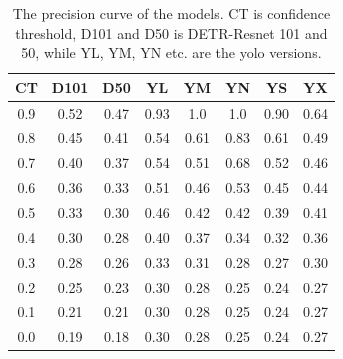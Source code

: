 \begin{table}
    \begin{centering}
    \begin{tabular}{|c||c|c|c|c|c|c|c|}
        \hline
        CT & D101 & D50 & YL & YM & YN & YS & YX \\
        \hline
        \hline
        0.9 & 0.52 & 0.47 & 0.93 & 1.0 & 1.0 & 0.90 & 0.64 \\
        \hline
        0.8 & 0.45 & 0.41 & 0.54 & 0.61 & 0.83 & 0.61 & 0.49 \\
        \hline
        0.7 & 0.40 & 0.37 & 0.54 & 0.51 & 0.68 & 0.52 & 0.46 \\
        \hline
        0.6 & 0.36 & 0.33 & 0.51 & 0.46 & 0.53 & 0.45 & 0.44 \\
        \hline
        0.5 & 0.33 & 0.30 & 0.46 & 0.42 & 0.42 & 0.39 & 0.41 \\
        \hline
        0.4 & 0.30 & 0.28 & 0.40 & 0.37 & 0.34 & 0.32 & 0.36 \\
        \hline
        0.3 & 0.28 & 0.26 & 0.33 & 0.31 & 0.28 & 0.27 & 0.30 \\
        \hline
        0.2 & 0.25 & 0.23 & 0.30 & 0.28 & 0.25 & 0.24 & 0.27 \\
        \hline
        0.1 & 0.21 & 0.21 & 0.30 & 0.28 & 0.25 & 0.24 & 0.27 \\
        \hline
        0.0 & 0.19 & 0.18 & 0.30 & 0.28 & 0.25 & 0.24 & 0.27 \\
        \hline
    \end{tabular}
    \caption{The precision curve of the models. CT is confidence threshold, D101 and D50 is DETR-Resnet 101 and 50, while YL, YM, YN etc. are the yolo versions.}
    \label{tab:p_curve}
    \end{centering}
\end{table}

